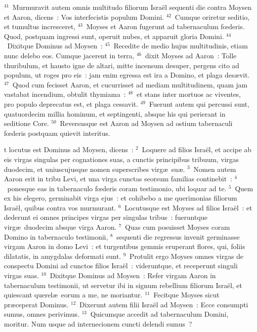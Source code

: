 ${}^{41}$~Murmuravit autem omnis multitudo filiorum Isra\"el sequenti die contra Moysen et Aaron, dicens~: Vos interfecistis populum Domini.
${}^{42}$~Cumque oriretur seditio, et tumultus incresceret,
${}^{43}$~Moyses et Aaron fugerunt ad tabernaculum fœderis. Quod, postquam ingressi sunt, operuit nubes, et apparuit gloria Domini.
${}^{44}$~Dixitque Dominus ad Moysen~:
${}^{45}$~Recedite de medio hujus multitudinis, etiam nunc delebo eos. Cumque jacerent in terra,
${}^{46}$~dixit Moyses ad Aaron~: Tolle thuribulum, et hausto igne de altari, mitte incensum desuper, pergens cito ad populum, ut roges pro eis~: jam enim egressa est ira a Domino, et plaga des\ae vit.
${}^{47}$~Quod cum fecisset Aaron, et cucurrisset ad mediam multitudinem, quam jam vastabat incendium, obtulit thymiama~:
${}^{48}$~et stans inter mortuos ac viventes, pro populo deprecatus est, et plaga cessavit.
${}^{49}$~Fuerunt autem qui percussi sunt, quatuordecim millia hominum, et septingenti, absque his qui perierant in seditione Core.
${}^{50}$~Reversusque est Aaron ad Moysen ad ostium tabernaculi fœderis postquam quievit interitus.

\bchapter
{}t locutus est Dominus ad Moysen, dicens~:
${}^{2}$~Loquere ad filios Isra\"el, et accipe ab eis virgas singulas per cognationes suas, a cunctis principibus tribuum, virgas duodecim, et uniuscujusque nomen superscribes virg\ae\ su\ae .
${}^{3}$~Nomen autem Aaron erit in tribu Levi, et una virga cunctas seorsum familias continebit~:
${}^{4}$~ponesque eas in tabernaculo fœderis coram testimonio, ubi loquar ad te.
${}^{5}$~Quem ex his elegero, germinabit virga ejus~: et cohibebo a me querimonias filiorum Isra\"el, quibus contra vos murmurant.
${}^{6}$~Locutusque est Moyses ad filios Isra\"el~: et dederunt ei omnes principes virgas per singulas tribus~: fueruntque virg\ae\ duodecim absque virga Aaron.
${}^{7}$~Quas cum posuisset Moyses coram Domino in tabernaculo testimonii,
${}^{8}$~sequenti die regressus invenit germinasse virgam Aaron in domo Levi~: et turgentibus gemmis eruperant flores, qui, foliis dilatatis, in amygdalas deformati sunt.
${}^{9}$~Protulit ergo Moyses omnes virgas de conspectu Domini ad cunctos filios Isra\"el~: videruntque, et receperunt singuli virgas suas.
${}^{10}$~Dixitque Dominus ad Moysen~: Refer virgam Aaron in tabernaculum testimonii, ut servetur ibi in signum rebellium filiorum Isra\"el, et quiescant querel\ae\ eorum a me, ne moriantur.
${}^{11}$~Fecitque Moyses sicut pr\ae ceperat Dominus.
${}^{12}$~Dixerunt autem filii Isra\"el ad Moysen~: Ecce consumpti sumus, omnes perivimus.
${}^{13}$~Quicumque accedit ad tabernaculum Domini, moritur. Num usque ad internecionem cuncti delendi sumus~?

